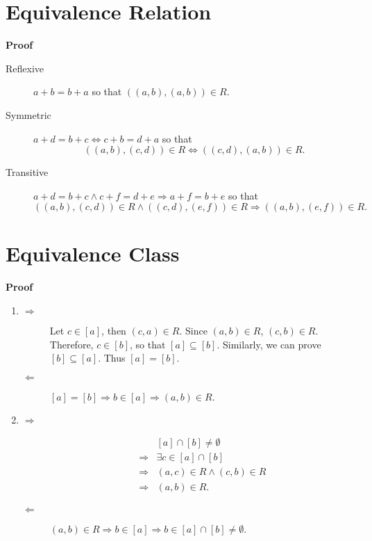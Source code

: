 \documentclass{../../cls/sig-alternate-05-2015}
\begin{document}
\section{Equivalence Relation}
\textbf{Proof}\begin{description}
	\item[Reflexive] $a + b = b + a$ so that $((a, b), (a, b)) \in R$.
	\item[Symmetric] $a + d = b + c \Leftrightarrow c + b = d + a$ so that \begin{equation}
		((a, b), (c, d)) \in R \Leftrightarrow ((c, d), (a, b)) \in R.
	\end{equation}
	\item[Transitive] $a + d = b + c \land c + f = d + e \Rightarrow a + f = b + e$ so that \begin{equation}
		((a, b), (c, d)) \in R \land ((c, d), (e, f)) \in R \Rightarrow ((a, b), (e, f)) \in R.
	\end{equation}
\end{description}

\section{Equivalence Class}
\textbf{Proof}\begin{enumerate}[label=(\alph*)]
	\item \begin{description}
		\item[$\Rightarrow$] Let $c \in [a]$, then $(c, a) \in R$. Since $(a, b) \in R$, $(c, b) \in R$. Therefore, $c \in [b]$, so that $[a] \subseteq [b]$. Similarly, we can prove $[b] \subseteq [a]$. Thus $[a] = [b]$.
		\item[$\Leftarrow$] $[a] = [b] \Rightarrow b \in [a] \Rightarrow (a, b) \in R$.
	\end{description}
	\item \begin{description}
		\item[$\Rightarrow$] \begin{align}
			\begin{aligned}
			& [a] \cap [b] \ne \emptyset\\
			\Rightarrow & \exists c \in [a] \cap [b]\\
			\Rightarrow & (a, c) \in R \land (c, b) \in R\\
			\Rightarrow & (a, b) \in R.
			\end{aligned}
		\end{align}
		\item[$\Leftarrow$] $(a, b) \in R \Rightarrow b \in [a] \Rightarrow b \in [a] \cap [b] \ne \emptyset$.
	\end{description}
\end{enumerate}
\end{document}

